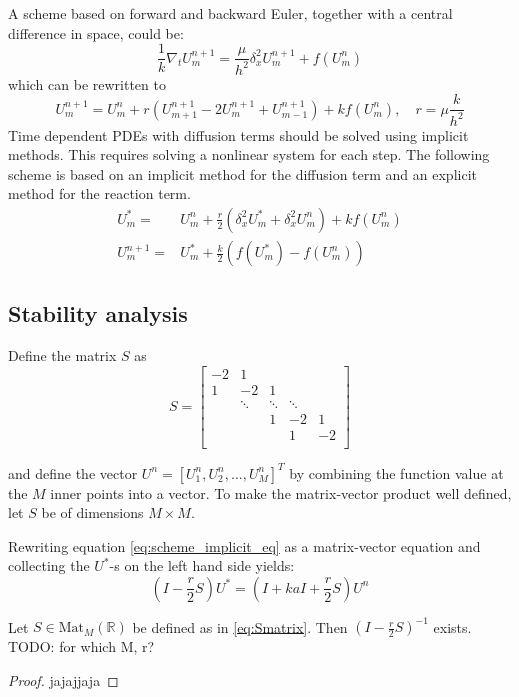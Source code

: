 A scheme based on forward and backward Euler,
together with a central difference in space, could be:
$$
  \frac{1}{k}\nabla_tU_{m}^{n+1}=\frac{\mu}{h^2}\delta_x^2U_{m}^{n+1}+f(U_{m}^{n} )
$$
which can be rewritten to 
$$
  U_{m}^{n+1} = U_{m}^{n} + r (U_{m+1}^{n+1}-2U_{m}^{n+1}+U_{m-1}^{n+1}) + kf(U_{m}^{n}), \quad r = \mu\frac{k}{h^2}
$$
Time dependent PDEs with diffusion terms should be solved using implicit methods.
This requires solving a nonlinear system for each step.
The following scheme is based on an implicit method
for the diffusion term and an explicit method for the reaction term.
\begin{align}
  \label{eq:scheme_implicit_eq}
    U_{m}^{*} =& U_{m}^{n} +\frac{r}{2}(\delta_x^2 U_{m}^{*} + \delta_x^2 U_{m}^{n} ) + kf(U_{m}^{n}) \\
  \label{eq:scheme_explicit_eq}
    U_{m}^{n+1} =& U_{m}^{*} + \frac{k}{2}(f(U_{m}^{*}) - f(U_{m}^{n}))
\end{align}

\subsection{Stability analysis}

Define the matrix \( S \) as
\begin{equation}
  \label{eq:Smatrix}
  S = 
  \begin{bmatrix}
    -2 & 1 &  &  & \\
    1& -2 & 1 &  & \\
     & \ddots & \ddots & \ddots & \\
     &  & 1 & -2 & 1\\
     &  &  & 1 & -2\\
  \end{bmatrix}
\end{equation}

and define the vector \( U^n = [U_1^n, U_2^n, \dots, U_M^n]^T \)
by combining the function value at the \( M \) inner points into a vector.
To make the matrix-vector product well defined, let \( S \) be of dimensions
\( M \times M \).

Rewriting equation \ref{eq:scheme_implicit_eq} as a matrix-vector equation
and collecting the \( U^* \)-s on the left hand side yields:
\begin{equation}
  (I - \frac{r}{2}S)U^* = (I + kaI + \frac{r}{2}S) U^n
\end{equation}

\begin{lemma}
  \label{lemma:existance_of_inverse}
  Let \( S \in \text{Mat}_M(\mathbb{R}) \) be defined as in \eqref{eq:Smatrix}.
  Then \( \left(I - \frac{r}{2}S\right)^{-1}\) exists. TODO: for which M, r?
\end{lemma}
\begin{proof}
    jajajjaja
\end{proof}

